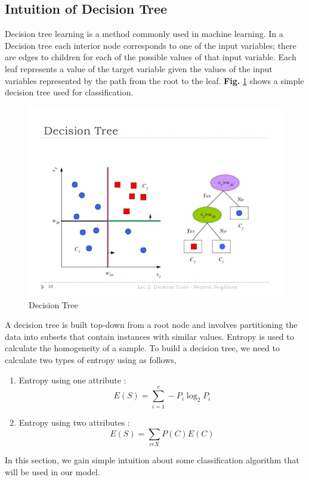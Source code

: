 \subsection{Intuition of Decision Tree}
Decision tree learning is a method commonly used in machine learning. In a Decision tree each interior node  corresponds to one of the input variables; there are edges to children for each of the possible values of that input variable. Each leaf represents a value of the target variable given the values of the input variables represented by the path from the root to the leaf. \textbf{Fig.} \ref{fig:DCT} shows a simple decision tree used for classification.
\begin{figure}[h!]
    \centering
    \includegraphics[scale=0.4]{Figures/decision_tree.jpg}
    \caption{Decision Tree}
    \label{fig:DCT}
\end{figure}

A decision tree is built top-down from a root node and involves partitioning the data into subsets that contain instances with similar values. Entropy is used to calculate the homogeneity of a sample. To build a decision tree, we need to calculate two types of entropy using as follows,
\begin{enumerate}
    \item Entropy using one attribute :
    \begin{equation}
         E(S) = \sum_{i=1}^{c}-P_i \log_2P_i
    \end{equation}
    \item Entropy using two attributes :
    \begin{equation}
        E(S) = \sum_{c\epsilon X}{}P(C)E(C) 
    \end{equation}
    
\end{enumerate}
\par\noindent
In this section, we gain simple intuition about some classification algorithm that will be used in our model. 


